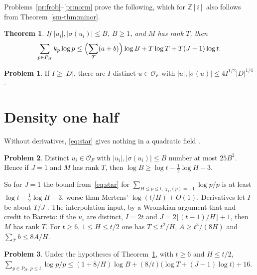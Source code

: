 \documentclass[reqno]{amsart}
\theoremstyle{definition}
\newtheorem{problem}{Problem}[section]
\theoremstyle{plain}
\newtheorem{theorem}{Theorem}[section]
\newcommand{\Z}{\mathbb{Z}}
\newcommand{\OF}{\mathcal{O}_F}
\newcommand{\T}{\mathcal{T}}
\begin{document}
Problems~\ref{pr:frob}--\ref{pr:norm} prove the following, which for \(\Z[i]\) also follows from Theorem~\ref{sm-thm:minor}.

\begin{theorem}\label{thm:star}
If \(\lvert u_i \rvert, \lvert \sigma(u_i) \rvert \le B\), \(B \ge 1\), and \(M\) has rank \(T\), then
\begin{equation}\label{eq:star}
  \sum_{p \in P_H} k_p \log p \le \Bigl( \sum_\T (a + b) \Bigr) \log B + T\log T + T(J - 1)\log t .
\end{equation}
\end{theorem}

\begin{problem}\label{pr:points}
If \(I \ge \lvert D \rvert\), there are \(I\) distinct \(u \in \OF\) with \(\lvert u \rvert, \lvert \sigma(u) \rvert \le 4 I^{1/2} \lvert D \rvert^{1/4}\).
\end{problem}

\section{Density one half}\label{sec:density}

Without derivatives, \eqref{eq:star} gives nothing in a quadratic field \cite[Ex.~24]{N}.

\begin{problem}\label{pr:no-derivatives}
Distinct \(u_i \in \OF\) with \(\lvert u_i \rvert, \lvert \sigma(u_i) \rvert \le B\) number at most \(25B^2\).  Hence if \(J = 1\) and \(M\) has rank \(T\), then \(\log B \ge \log t - \frac12\log H - 3\).
\end{problem}

So for \(J = 1\) the bound from~\eqref{eq:star} for \(\sum_{H \le p \le t,\, \chi_D(p) = -1} \log p/p\) is at least \(\log t - \frac12 \log H - 3\), worse than Mertens' \(\log(t/H) + O(1)\).  Derivatives let \(I\) be about \(T/J\) \cite{Gr}.  The interpolation input, by a Wronskian argument that \cite[proof of Thm.~1]{Ko} and \cite[Lemma~17]{N} credit to Barreto: if the \(u_i\) are distinct, \(I = 2t\) and \(J = 2\lfloor (t-1)/H \rfloor + 1\), then \(M\) has rank \(T\).  For \(t \ge 6\), \(1 \le H \le t/2\) one has \(T \le t^2/H\), \(A \ge t^3/(8H)\) and \(\sum_\T b \le 8A/H\).

\begin{problem}\label{pr:normalize}
Under the hypotheses of Theorem~\ref{thm:star}, with \(t \ge 6\) and \(H \le t/2\),
\(\sum_{p \in P_H,\, p \le t} \log p/p \le (1 + 8/H)\log B + (8/t)\bigl(\log T + (J-1)\log t\bigr) + 16\).
\end{problem}
\end{document}
